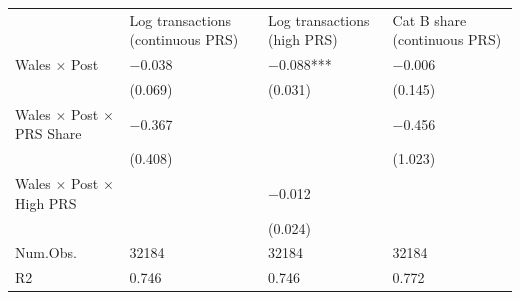 \begin{tabular}{llll}
& Log transactions
(continuous PRS) & Log transactions
(high PRS) & Cat B share
(continuous PRS) \\
Wales $\times$ Post & \num{-0.038} & \num{-0.088}*** & \num{-0.006} \\
& (\num{0.069}) & (\num{0.031}) & (\num{0.145}) \\
Wales $\times$ Post $\times$ PRS Share & \num{-0.367} &  & \num{-0.456} \\
& (\num{0.408}) &  & (\num{1.023}) \\
Wales $\times$ Post $\times$ High PRS &  & \num{-0.012} &  \\
&  & (\num{0.024}) &  \\
Num.Obs. & \num{32184} & \num{32184} & \num{32184} \\
R2 & \num{0.746} & \num{0.746} & \num{0.772} \\
\end{tabular}
